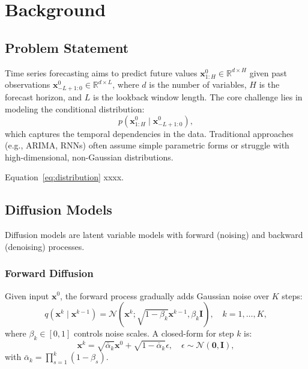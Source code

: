 \section{Background}\label{sec:background}
\subsection{Problem Statement}
Time series forecasting aims to predict future values $\mathbf{x}_{1:H}^0 \in \mathbb{R}^{d \times H}$ given past observations $\mathbf{x}_{-L+1:0}^0 \in \mathbb{R}^{d \times L}$, where $d$ is the number of variables, $H$ is the forecast horizon, and $L$ is the lookback window length. The core challenge lies in modeling the conditional distribution:
\begin{equation}\label{eq:distribution}
	p(\mathbf{x}_{1:H}^0 \mid \mathbf{x}_{-L+1:0}^0),
\end{equation}
which captures the temporal dependencies in the data. Traditional approaches (e.g., ARIMA, RNNs) often assume simple parametric forms or struggle with high-dimensional, non-Gaussian distributions.

Equation~\eqref{eq:distribution} xxxx.

\subsection{Diffusion Models}
Diffusion models \cite{Ho2020DDPM} are latent variable models with forward (noising) and backward (denoising) processes.

\subsubsection{Forward Diffusion}
Given input $\mathbf{x}^0$, the forward process gradually adds Gaussian noise over $K$ steps:
\begin{equation}
	q(\mathbf{x}^k \mid \mathbf{x}^{k-1}) = \mathcal{N}(\mathbf{x}^k; \sqrt{1-\beta_k}\mathbf{x}^{k-1}, \beta_k\mathbf{I}), \quad k=1,\dots,K,
\end{equation}
where $\beta_k \in [0,1]$ controls noise scales. A closed-form for step $k$ is:
\begin{equation}
	\mathbf{x}^k = \sqrt{\bar{\alpha}_k}\mathbf{x}^0 + \sqrt{1-\bar{\alpha}_k}\epsilon, \quad \epsilon \sim \mathcal{N}(\mathbf{0},\mathbf{I}),
\end{equation}
with $\bar{\alpha}_k = \prod_{s=1}^k (1-\beta_s)$.


